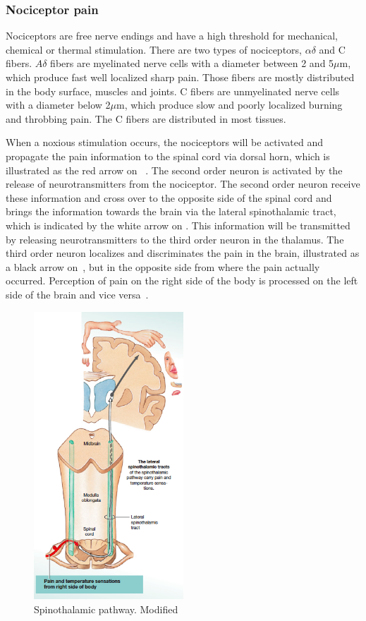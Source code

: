 \subsubsection{Nociceptor pain}
Nociceptors are free nerve endings and have a high threshold for mechanical, chemical or thermal stimulation. There are two types of nociceptors, $\alpha\delta$ and C fibers. $A\delta$ fibers are myelinated nerve cells with a diameter between 2 and 5$\mu$m, which produce fast well localized sharp pain. Those fibers are mostly distributed in the body surface, muscles and joints. C fibers are unmyelinated nerve cells with a diameter below 2$\mu$m, which produce slow and poorly localized burning and throbbing pain. The C fibers are distributed in most tissues. \cite{Steeds2013}

When a noxious stimulation occurs, the nociceptors will be activated and propagate the pain information to the spinal cord via dorsal horn, which is illustrated as the red arrow on ~\cite{Martini2012}. The second order neuron is activated by the release of neurotransmitters from the nociceptor. The second order neuron receive these information and cross over to the opposite side of the spinal cord and brings the information towards the brain via the lateral spinothalamic tract, which is indicated by the white arrow on . This information will be transmitted by releasing neurotransmitters to the third order neuron in the thalamus. The third order neuron localizes and discriminates the pain in the brain, illustrated as a black arrow on~, but in the opposite side from where the pain actually occurred. Perception of pain on the right side of the body is processed on the left side of the brain and vice versa~\cite{Martini2012}. 


\begin{figure}[H]
	\includegraphics[width=0.5\textwidth]{figures/pathways.png} 
	\caption{Spinothalamic pathway. Modified~\cite{Martini2012}}
	\label{fig:pathways}  
\end{figure}   

